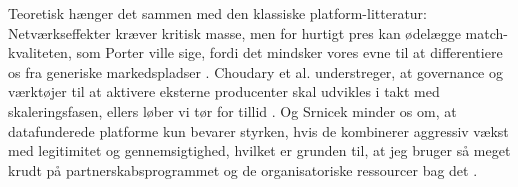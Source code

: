 Teoretisk hænger det sammen med den klassiske platform-litteratur: Netværkseffekter kræver kritisk masse, men for hurtigt pres kan ødelægge match-kvaliteten, som Porter ville sige, fordi det mindsker vores evne til at differentiere os fra generiske markedspladser \citep{Porter2008}. Choudary et al. understreger, at governance og værktøjer til at aktivere eksterne producenter skal udvikles i takt med skaleringsfasen, ellers løber vi tør for tillid \citep{Choudary2016}. Og Srnicek minder os om, at datafunderede platforme kun bevarer styrken, hvis de kombinerer aggressiv vækst med legitimitet og gennemsigtighed, hvilket er grunden til, at jeg bruger så meget krudt på partnerskabsprogrammet og de organisatoriske ressourcer bag det \citep{Srnicek2017}.
